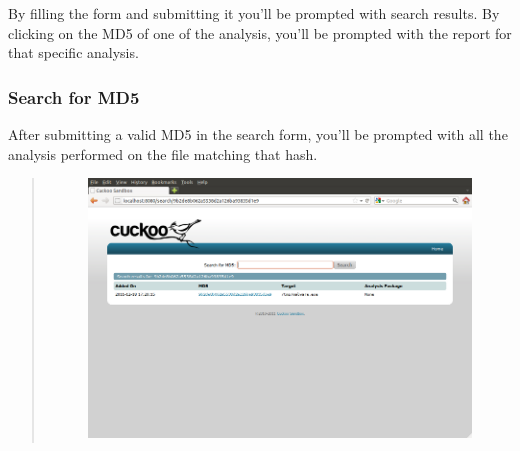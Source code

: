 \documentclass[letterpaper,10pt,english]{sphinxmanual}
\begin{document}
By filling the form and submitting it you'll be prompted with search results.
By clicking on the MD5 of one of the analysis, you'll be prompted with the
report for that specific analysis.


\subsubsection{Search for MD5}
\label{usage/web:search-for-md5}
After submitting a valid MD5 in the search form, you'll be prompted with all the
analysis performed on the file matching that hash.
\begin{quote}
\begin{figure}[htbp]
\centering

\includegraphics{cuckoo_web_search.png}
\end{figure}
\end{quote}
\end{document}
